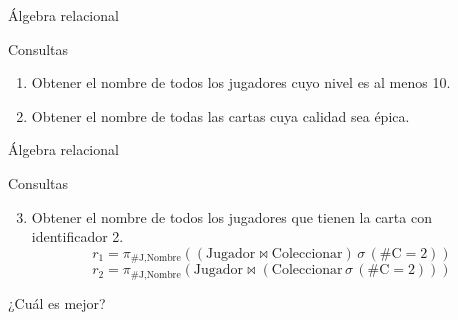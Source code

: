 \begin{frame}{\'Algebra relacional}

    \begin{block}{Consultas}
        \begin{enumerate}
            \item<2-> Obtener el nombre de todos los jugadores cuyo nivel es al menos 10.
            \item<4-> Obtener el nombre de todas las cartas cuya calidad sea \'epica.
        \end{enumerate}
    \end{block}

\end{frame}






\begin{frame}{\'Algebra relacional}

    \begin{block}{Consultas}
        \begin{enumerate}
            \setcounter{enumi}{2}
            \item Obtener el nombre de todos los jugadores que tienen la carta con identificador 2.
            $$ r_1 = \pi_{\text{\#J}, \text{Nombre}}((\text{Jugador} \Join \text{Coleccionar})\,\sigma\,(\text{\#C}=2)) $$
            $$ r_2 = \pi_{\text{\#J}, \text{Nombre}}(\text{Jugador} \Join (\text{Coleccionar}\,\sigma\,(\text{\#C}=2))) $$
        \end{enumerate}
        \vspace{5mm}

        \centering
        \large ¿Cu\'al es mejor?
        
        
    \end{block}
\end{frame}


